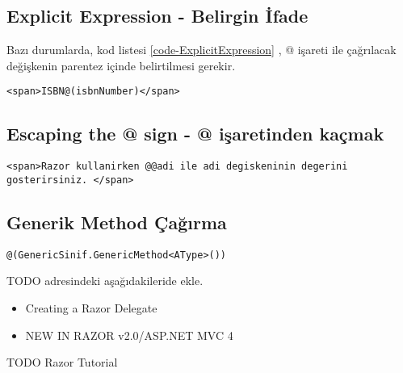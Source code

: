 \documentclass[10pt,a4paper]{article}
\begin{document}
\subsection{Explicit Expression - Belirgin İfade }
Bazı durumlarda, kod listesi \ref{code-ExplicitExpression} , 
@ işareti ile çağrılacak değişkenin parentez içinde belirtilmesi gerekir.


\begin{lstlisting}[label=code-ExplicitExpression,caption=Belirgin İfade  ]
<span>ISBN@(isbnNumber)</span>
\end{lstlisting}


\subsection{Escaping the @ sign - @ işaretinden kaçmak }


\begin{lstlisting}[label=code-EscapingAtSign ,caption= @ işaretinden kaçmak  ]
<span>Razor kullanirken @@adi ile adi degiskeninin degerini gosterirsiniz. </span>

\end{lstlisting}


\subsection{Generik Method Çağırma }

\begin{lstlisting}[label=code-CallingGenericMethod ,caption=Generik Method Çağırma  ]
@(GenericSinif.GenericMethod<AType>())

\end{lstlisting}


TODO \cite{Haack2011C} adresindeki aşağıdakileride ekle.
\begin{itemize}
\item Creating a Razor Delegate
\item NEW IN RAZOR v2.0/ASP.NET MVC 4
\end{itemize}

TODO Razor Tutorial \cite{Team2012Introduction}





% 

\end{document}
